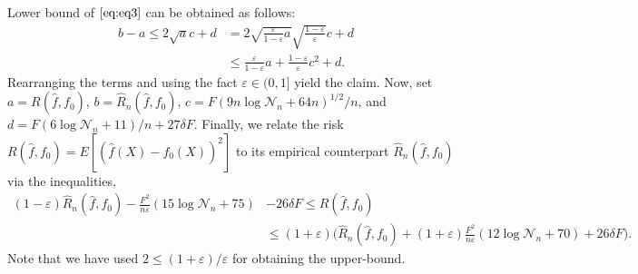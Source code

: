 \documentclass{article}
\theoremstyle{definition}
\begin{document}
Lower bound of $\eqref{eq:eq3}$ can be obtained as follows:
\begin{align*}
    b-a \leq 2\sqrt{a}c+d &= 2\sqrt{\frac{\varepsilon}{1-\varepsilon}a}\sqrt{\frac{1-\varepsilon}{\varepsilon}}c+d \\
    &\leq \frac{\varepsilon}{1-\varepsilon}a + \frac{1-\varepsilon}{\varepsilon}c^{2}+d.
\end{align*}
Rearranging the terms and using the fact $\varepsilon\in(0,1]$ yield the claim.
Now, set $a=R(\widehat{f},f_{0})$, $b=\widehat{R}_{n}(\widehat{f},f_{0})$, $c=F(9n\log\mathcal{N}_{n}+64n)^{1/2}/n$, and $d=F(6\log\mathcal{N}_{n}+11)/n+27\delta F$.
Finally, we relate the risk $R(\widehat{f},f_{0})=E[(\widehat{f}(X)-f_0(X))^{2}]$ to its empirical counterpart $\widehat{R}_{n}(\widehat{f},f_{0})$ via the inequalities,
\begin{align*}
    (1-\varepsilon)\widehat{R}_{n}(\widehat{f},f_{0})-\frac{F^{2}}{n\varepsilon}(15\log\mathcal{N}_{n}+75) & -26\delta F 
    \leq R(\widehat{f},f_{0}) \\
    &\leq (1+\varepsilon)\bigg(\widehat{R}_{n}(\widehat{f},f_{0}) + (1+\varepsilon)\frac{F^{2}}{n\varepsilon}(12\log\mathcal{N}_{n}+70)+26\delta F\bigg).
\end{align*}
Note that we have used $2\leq (1+\varepsilon)/\varepsilon$ for obtaining the upper-bound.
\end{document}
